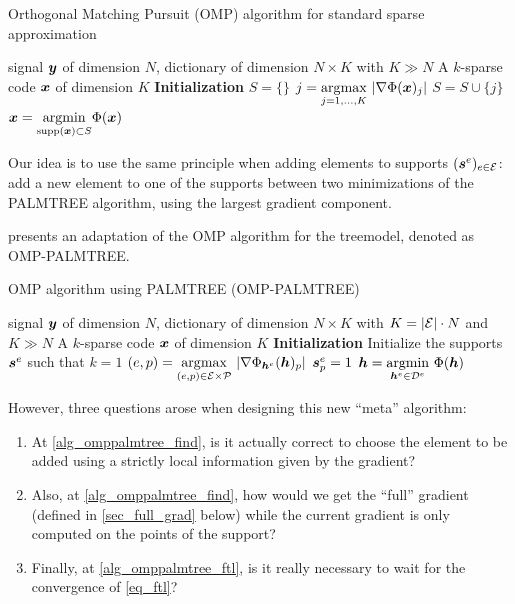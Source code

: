 \begin{algorithm}[!ht]
    \caption{Orthogonal Matching Pursuit (OMP) algorithm for standard sparse approximation}\label{alg_omp}
  \begin{algorithmic}[1]
    \Input signal $\bm{y}$ of dimension $N$, dictionary of dimension $N \times K$ with $K \gg N$
    \Output A $k$-sparse code $\bm{x}$ of dimension $K$
    \State \textbf{Initialization} $S=\{\}$
      \State $j =  \underset{j = 1,\dots,K}{\operatorname*{\arg\!\max}}~| \nabla \Phi(\bm{x})_j |$\label{alg_omp_pick_correlation}
      \State $S = S \cup \{j\}$
      \State $\bm{x} = \underset{\text{supp}(\bm{x}) \subset S}{\operatorname{argmin}} \Phi(\bm{x})$
    \EndFor
  \end{algorithmic}
\end{algorithm}

Our idea is to use the same principle when adding elements to supports $(\bm{s}^e)_{e \in \mathcal E}$: add a new element to one of the supports between two minimizations of the \ac{PALMTREE} algorithm, using the largest gradient component.

\noindent
{} presents an adaptation of the \ac{OMP} algorithm for the \gls{treemodel}, denoted as OMP-PALMTREE.

\begin{algorithm}[!ht]
    \caption{\ac{OMP} algorithm using \ac{PALMTREE} (OMP-PALMTREE)}\label{alg_omppalmtree}
  \begin{algorithmic}[1]
    \Input signal $\bm{y}$ of dimension $N$, dictionary of dimension $N \times K$ with $K = |\mathcal E| \cdot N$ and $K \gg N$
    \Output A $k$-sparse code $\bm{x}$ of dimension $K$
    \State \textbf{Initialization} Initialize the supports $\bm{s}^e$ such that $k=1$
      \State $(e,p) = \underset{(e,p) \in \mathcal E \times \mathcal P}{\operatorname*{\arg\!\max}}~ |\nabla \Phi_{\bm{h}^e}(\bm{h})_p|$\label{alg_omppalmtree_find}
      \State $\bm{s}^e_p = 1$
      \State $\bm{h} = \underset{\bm{h}^e \in {\mathcal D}^e}{\operatorname{argmin}}~ \Phi(\bm{h})$ \label{alg_omppalmtree_ftl}
    \EndFor
  \end{algorithmic}
\end{algorithm}

\noindent
However, three questions arose when designing this new “meta” algorithm:
\begin{enumerate}[label={\alph*)},noitemsep]
	\item At \cref{alg_omppalmtree_find}, is it actually correct to choose the element to be added using a strictly local information given by the gradient?
	\item Also, at \cref{alg_omppalmtree_find}, how would we get the “full” gradient (defined in \cref{sec_full_grad} below) while the current gradient is only computed on the points of the support?
	\item Finally, at \cref{alg_omppalmtree_ftl}, is it really necessary to wait for the convergence of \eqref{eq_ftl}?
\end{enumerate}

